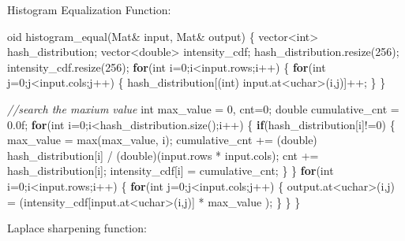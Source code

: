 \documentclass[]{article}
\newenvironment{Shaded}{\begin{snugshade}}{\end{snugshade}}
\newcommand{\KeywordTok}[1]{\textcolor[rgb]{0.13,0.29,0.53}{\textbf{{#1}}}}
\newcommand{\DataTypeTok}[1]{\textcolor[rgb]{0.13,0.29,0.53}{{#1}}}
\newcommand{\DecValTok}[1]{\textcolor[rgb]{0.00,0.00,0.81}{{#1}}}
\newcommand{\FloatTok}[1]{\textcolor[rgb]{0.00,0.00,0.81}{{#1}}}
\newcommand{\CommentTok}[1]{\textcolor[rgb]{0.56,0.35,0.01}{\textit{{#1}}}}
\newcommand{\NormalTok}[1]{{#1}}
\begin{document}
Histogram Equalization Function:

\begin{Shaded}
\begin{Highlighting}[]
\NormalTok{oid histogram_equal(Mat& input, Mat& output)}
\NormalTok{\{}
    \NormalTok{vector<}\DataTypeTok{int}\NormalTok{> hash_distribution;}
    \NormalTok{vector<}\DataTypeTok{double}\NormalTok{> intensity_cdf;}
    \NormalTok{hash_distribution.resize(}\DecValTok{256}\NormalTok{);}
    \NormalTok{intensity_cdf.resize(}\DecValTok{256}\NormalTok{);}
    \KeywordTok{for}\NormalTok{(}\DataTypeTok{int} \NormalTok{i=}\DecValTok{0}\NormalTok{;i<input.rows;i++)}
    \NormalTok{\{}
        \KeywordTok{for}\NormalTok{(}\DataTypeTok{int} \NormalTok{j=}\DecValTok{0}\NormalTok{;j<input.cols;j++)}
        \NormalTok{\{}
            \NormalTok{hash_distribution[(}\DataTypeTok{int}\NormalTok{) input.at<}\DataTypeTok{uchar}\NormalTok{>(i,j)]++;}
        \NormalTok{\}}
    \NormalTok{\}}

    \CommentTok{//search the maxium value}
    \DataTypeTok{int} \NormalTok{max_value = }\DecValTok{0}\NormalTok{, cnt=}\DecValTok{0}\NormalTok{;}
    \DataTypeTok{double} \NormalTok{cumulative_cnt = }\FloatTok{0.0f}\NormalTok{;}
    \KeywordTok{for}\NormalTok{(}\DataTypeTok{int} \NormalTok{i=}\DecValTok{0}\NormalTok{;i<hash_distribution.size();i++)}
    \NormalTok{\{}
        \KeywordTok{if}\NormalTok{(hash_distribution[i]!=}\DecValTok{0}\NormalTok{)}
        \NormalTok{\{}
            \NormalTok{max_value = max(max_value, i);}
            \NormalTok{cumulative_cnt += (}\DataTypeTok{double}\NormalTok{) hash_distribution[i] / (}\DataTypeTok{double}\NormalTok{)(input.rows * input.cols);}
            \NormalTok{cnt += hash_distribution[i];}
            \NormalTok{intensity_cdf[i] = cumulative_cnt;}
        \NormalTok{\}}
    \NormalTok{\}}
    \KeywordTok{for}\NormalTok{(}\DataTypeTok{int} \NormalTok{i=}\DecValTok{0}\NormalTok{;i<input.rows;i++)}
    \NormalTok{\{}
        \KeywordTok{for}\NormalTok{(}\DataTypeTok{int} \NormalTok{j=}\DecValTok{0}\NormalTok{;j<input.cols;j++)}
        \NormalTok{\{}
            \NormalTok{output.at<}\DataTypeTok{uchar}\NormalTok{>(i,j) = (intensity_cdf[input.at<}\DataTypeTok{uchar}\NormalTok{>(i,j)] * max_value );}
        \NormalTok{\}}
    \NormalTok{\}}
\NormalTok{\}}
\end{Highlighting}
\end{Shaded}

Laplace sharpening function:
\end{document}
